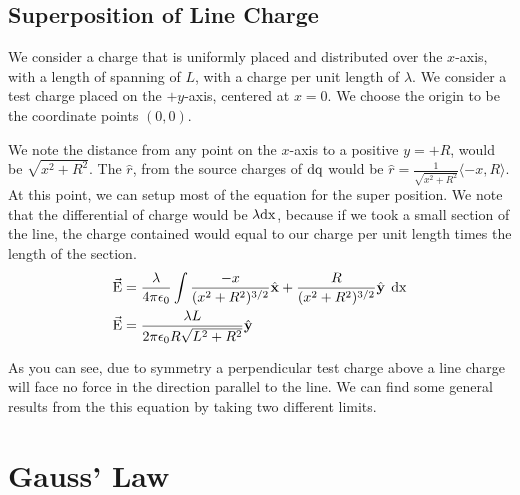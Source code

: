 \subsection{Superposition of Line Charge}
We consider a charge that is uniformly placed and distributed over the $x$-axis, with a length of spanning of $L$, with a charge per unit length of $\lambda$. We consider a test charge placed on the $+y$-axis, centered at $x=0$. We choose the origin to be the coordinate points $(0,0)$.


We note the distance from any point on the $x$-axis to a positive $y=+R$, would be $\sqrt{x^2+R^2}$. The $\hat{r}$, from the source charges of $\mathrm{dq}$ would be $\hat{r} = \frac{1}{\sqrt{x^2+R^2}} \langle -x, R \rangle$. At this point, we can setup most of the equation for the super position. We note that the differential of charge would be $\lambda \mathrm{dx}$, because if we took a small section of the line, the charge contained would equal to our charge per unit length times the length of the section.
\begin{align*}
	\vec{\mathrm{E}} &= \frac{\lambda}{4\pi\epsilon_0}\int \frac{-x}{(x^2+R^2)^{3/2}}\hat{\mathbf{x}} +   \frac{R}{(x^2+R^2)^{3/2}}\hat{\mathbf{y}} \:\: \mathrm{dx} \\ 
	\vec{\mathrm{E}} &= \frac{\lambda  L}{2 \pi \epsilon _0 R \sqrt{L^2+R^2}} \hat{\mathbf{y}}
\end{align*}

As you can see, due to symmetry a perpendicular test charge above a line charge will face no force in the direction parallel to the line. We can find some general results from the this equation by taking two different limits. 
\pagebreak
\section{Gauss' Law}